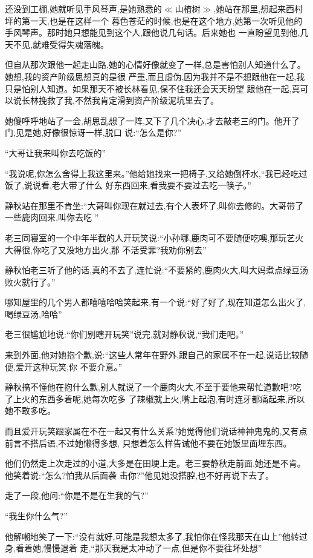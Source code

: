 ﻿\documentclass[12pt]{article}
\begin{document}
还没到工棚,她就听见手风琴声,是她熟悉的$\ll$山楂树$\gg$,她站在那里,想起来西村坪的第一天,也是在这样一个
暮色苍茫的时候,也是在这个地方,她第一次听见他的手风琴声。那时她只想能见到这个人,跟他说几句话。后来她也
一直盼望见到他,几天不见,就难受得失魂落魄。

但自从那次跟他一起走山路,她的心情好像就变了一样,总是害怕别人知道什么了。她想,我的资产阶级思想真的是很
严重,而且虚伪,因为我并不是不想跟他在一起,我只是怕别人知道。如果那天不被长林看见,保不住我还会天天盼望
跟他在一起,真可以说长林挽救了我,不然我肯定滑到资产阶级泥坑里去了。

她傻呼呼地站了一会,胡思乱想了一阵,又下了几个决心,才去敲老三的门。他开了门,见是她,好像很惊讶一样,脱口
说:``怎么是你?''

``大哥让我来叫你去吃饭的\myrule ''

``我说呢,你怎么舍得上我这里来。''他给她找来一把椅子,又给她倒杯水,``我已经吃过饭了,说说看,老大带了什么
好东西回来,看我要不要过去吃一筷子。''

静秋站在那里不肯坐:``大哥叫你现在就过去,有个人表坏了,叫你去修的。大哥带了一些鹿肉回来,叫你去吃
\myrule ''

老三同寝室的一个中年半截的人开玩笑说:``小孙哪,鹿肉可不要随便吃噢,那玩艺火大得很,你吃了又没地方出火,那
不活受罪?我劝你别去\myrule ''


静秋怕老三听了他的话,真的不去了,连忙说:``不要紧的,鹿肉火大,叫大妈煮点绿豆汤败火就行了。''

哪知屋里的几个男人都嘻嘻哈哈笑起来,有一个说:``好了好了,现在知道怎么出火了,喝绿豆汤,哈哈\myrule ''

老三很尴尬地说:``你们别瞎开玩笑\myrule ''说完,就对静秋说,``我们走吧。''

来到外面,他对她抱个歉,说:``这些人常年在野外,跟自己的家属不在一起,说话比较\myrule 随便,爱开这种玩笑,你
不要介意。''

静秋搞不懂他在抱什么歉,别人就说了一个鹿肉火大,不至于要他来帮忙道歉吧?吃了上火的东西多着呢,她每次吃多
了辣椒就上火,嘴上起泡,有时连牙都痛起来,所以她不敢多吃。

而且爱开玩笑跟家属在不在一起又有什么关系?她觉得他们说话神神鬼鬼的,又有点前言不搭后语,不过她懒得多想,
只想着怎么样告诫他不要在她饭里面埋东西。

他们仍然走上次走过的小道,大多是在田埂上走。老三要静秋走前面,她还是不肯。他笑着说:``怎么?怕我从后面袭
击你?''他见她没搭腔,也不好再说下去了。

走了一段,他问:``你\myrule 是不是在生我的气?''

``我生你什么气?''

他解嘲地笑了一下:``没有就好,可能是我想太多了,我怕你在怪我那天在山上\myrule ''他转过身,看着她,慢慢退着
走,``那天我是太\myrule 冲动了一点,但是你不要往坏处想\myrule ''
\end{document}

